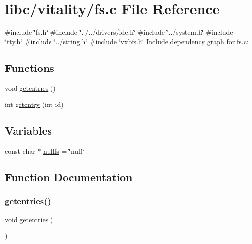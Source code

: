 \hypertarget{a00125}{}\section{libc/vitality/fs.c File Reference}
\label{a00125}
{\ttfamily \#include \char`\"{}fs.\+h\char`\"{}}\newline
{\ttfamily \#include \char`\"{}../../drivers/ide.\+h\char`\"{}}\newline
{\ttfamily \#include \char`\"{}../system.\+h\char`\"{}}\newline
{\ttfamily \#include \char`\"{}tty.\+h\char`\"{}}\newline
{\ttfamily \#include \char`\"{}../string.\+h\char`\"{}}\newline
{\ttfamily \#include \char`\"{}vxbfs.\+h\char`\"{}}\newline
Include dependency graph for fs.\+c\+:
\subsection*{Functions}
\begin{DoxyCompactItemize}
\item 
void \hyperlink{a00125_a414110036132977c34813673360e1a63_a414110036132977c34813673360e1a63}{getentries} ()
\item 
int \hyperlink{a00125_a3fb32d07d3bd05144a196c94fc59c0d1_a3fb32d07d3bd05144a196c94fc59c0d1}{getentry} (int id)
\end{DoxyCompactItemize}
\subsection*{Variables}
\begin{DoxyCompactItemize}
\item 
const char $\ast$ \hyperlink{a00125_a36265ac74fd925405e1179e799961f1e_a36265ac74fd925405e1179e799961f1e}{nullfs} = \char`\"{}null\char`\"{}
\end{DoxyCompactItemize}


\subsection{Function Documentation}
\mbox{\label{a00125_a414110036132977c34813673360e1a63_a414110036132977c34813673360e1a63}} 
\subsubsection{\texorpdfstring{getentries()}{getentries()}}
{\footnotesize\ttfamily void getentries (\begin{DoxyParamCaption}{ }\end{DoxyParamCaption})}



